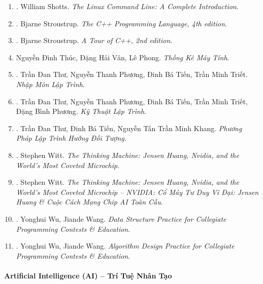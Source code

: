 \documentclass{article}
\begin{document}
\begin{enumerate}
	\item \cite{Shotts2019}. {\sc William Shotts}. {\it The Linux Command Line: A Complete Introduction}.\hfill{\sf[reading]}

	\item \cite{Stroustrup2013}. {\sc Bjarne Stroustrup}. {\it The C++ Programming Language, 4th edition}.\hfill{\sf[reading]}

	\item \cite{Stroustrup2018}. Bjarne Stroustrup. {\it A Tour of C++, 2nd edition}.\hfill{\sf[reading]}
	
	\item {\sc Nguyễn Đình Thúc, Đặng Hải Vân, Lê Phong}. {\it Thống Kê Máy Tính}.\hfill{\sf[done]}

	\item \cite{Thu_Phuong_Tien_Triet_NMLT}. {\sc Trần Đan Thư, Nguyễn Thanh Phương, Đinh Bá Tiến, Trần Minh Triết}. {\it Nhập Môn Lập Trình}.\hfill{\sf[done]}

	\item \cite{Thu_Phuong_Tien_Triet_Phuong_KTLT}. {\sc Trần Đan Thư, Nguyễn Thanh Phương, Đinh Bá Tiến, Trần Minh Triết, Đặng Bình Phương}. {\it Kỹ Thuật Lập Trình}.\hfill{\sf[reading]}

	\item \cite{Thu_Tien_Khang_PPLTHDT}. {\sc Trần Đan Thư, Đinh Bá Tiến, Nguyễn Tấn Trần Minh Khang}. {\it Phương Pháp Lập Trình Hướng Đối Tượng}.\hfill{\sf[reading]}

	\item \cite{Witt_NVIDIA}. {\sc Stephen Witt}. {\it The Thinking Machine: Jensen Huang, Nvidia, and the World's Most Coveted Microchip}.

	\item \cite{Witt_NVIDIA_VN}. {\sc Stephen Witt}. {\it The Thinking Machine: Jensen Huang, Nvidia, and the World's Most Coveted Microchip -- NVIDIA: Cổ Máy Tư Duy Vĩ Đại: Jensen Huang \& Cuộc Cách Mạng Chip AI Toàn Cầu}.\hfill{\sf[done]}

    \item \cite{Wu_Wang2016}. {\sc Yonghui Wu, Jiande Wang}. {\it Data Structure Practice for Collegiate Programming Contests \& Education}.

    \item \cite{Wu_Wang2018}. {\sc Yonghui Wu, Jiande Wang}. {\it Algorithm Design Practice for Collegiate Programming Contests \& Education}.
\end{enumerate}

\paragraph{Artificial Intelligence (AI) -- Trí Tuệ Nhân Tạo}
\end{document}
